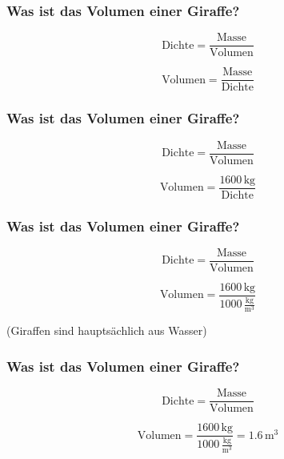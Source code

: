 \documentclass{beamer}
\begin{document}
\begin{frame}
\frametitle{Was ist das Volumen einer Giraffe?}


\[ 
\text{Dichte}  = \frac{\text{Masse}}{\text{Volumen}}
\]

\[
\text{Volumen} =  \frac{\text{Masse}}{\text{Dichte}} 
\]


\end{frame}

\begin{frame}
\frametitle{Was ist das Volumen einer Giraffe?}


\[ 
\text{Dichte}  = \frac{\text{Masse}}{\text{Volumen}}
\]
 
\[
\text{Volumen} =  \frac{1600\,\text{kg}}{\text{Dichte}} 
\]



\end{frame}


\begin{frame}
\frametitle{Was ist das Volumen einer Giraffe?}


\[ 
\text{Dichte}  = \frac{\text{Masse}}{\text{Volumen}}
\]
 
\[
\text{Volumen} =  \frac{1600\,\text{kg}}{1000\,\frac{\text{kg}}{\text{m}^3}} 
\]


\pause

(Giraffen sind hauptsächlich aus Wasser)


\end{frame}


\begin{frame}
\frametitle{Was ist das Volumen einer Giraffe?}


\[ 
\text{Dichte}  = \frac{\text{Masse}}{\text{Volumen}}
\]
 
\[
\text{Volumen} =  \frac{1600\,\text{kg}}{1000\,\frac{\text{kg}}{\text{m}^3}} =    1.6\,\text{m}^3
\]


\end{frame}

 

\begin{frame}
\end{frame}
\end{document}
